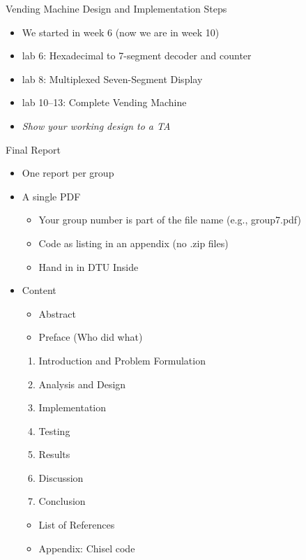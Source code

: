 \begin{frame}[fragile]{Vending Machine Design and Implementation Steps}
\begin{itemize}
\item We started in week 6 (now we are in week 10)
\item lab 6: Hexadecimal to 7-segment decoder and counter
\item lab 8: Multiplexed Seven-Segment Display
\item lab 10--13: Complete Vending Machine
\item \emph{Show your working design to a TA}
\end{itemize}
\end{frame}

\begin{frame}[fragile]{Final Report}
\begin{itemize}
\item One report per group
\item A single PDF
\begin{itemize}
\item Your group number is part of the file name (e.g., group7.pdf)
\item Code as listing in an appendix (no .zip files)
\item Hand in in DTU Inside
\end{itemize}
\item Content
\begin{itemize}
\item Abstract
\item Preface (Who did what)
\end{itemize}
\begin{enumerate}
\item Introduction and Problem Formulation
\item Analysis and Design
\item Implementation
\item Testing
\item Results
\item Discussion
\item Conclusion
\end{enumerate}
\begin{itemize}
\item List of References
\item Appendix: Chisel code
\end{itemize}
\end{itemize}
\end{frame}

